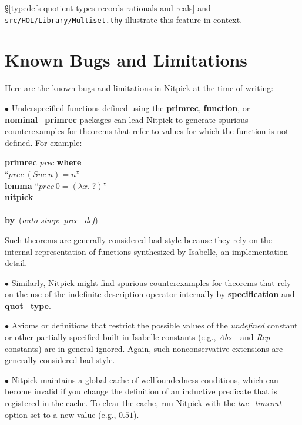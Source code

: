 \documentclass[a4paper,12pt]{article}
\def\unk{{?}}
\def\undef{(\lambda x.\; \unk)}
\begin{document}
\S\ref{typedefs-quotient-types-records-rationals-and-reals} and
\texttt{src/HOL/Library/Multiset.thy} illustrate this feature in context.

\section{Known Bugs and Limitations}
\label{known-bugs-and-limitations}

Here are the known bugs and limitations in Nitpick at the time of writing:

\begin{enum}
\item[$\bullet$] Underspecified functions defined using the \textbf{primrec},
\textbf{function}, or \textbf{nominal\_\allowbreak primrec} packages can lead
Nitpick to generate spurious counterexamples for theorems that refer to values
for which the function is not defined. For example:

\prew
\textbf{primrec} \textit{prec} \textbf{where} \\
``$\textit{prec}~(\textit{Suc}~n) = n$'' \\[2\smallskipamount]
\textbf{lemma} ``$\textit{prec}~0 = \undef$'' \\
\textbf{nitpick} \\[2\smallskipamount]
 \nopagebreak\\[2\smallskipamount]
\textbf{by}~(\textit{auto simp}:~\textit{prec\_def})
\postw

Such theorems are generally considered bad style because they rely on the
internal representation of functions synthesized by Isabelle, an implementation
detail.

\item[$\bullet$] Similarly, Nitpick might find spurious counterexamples for
theorems that rely on the use of the indefinite description operator internally
by \textbf{specification} and \textbf{quot\_type}.

\item[$\bullet$] Axioms or definitions that restrict the possible values of the
\textit{undefined} constant or other partially specified built-in Isabelle
constants (e.g., \textit{Abs\_} and \textit{Rep\_} constants) are in general
ignored. Again, such nonconservative extensions are generally considered bad
style.

\item[$\bullet$] Nitpick maintains a global cache of wellfoundedness conditions,
which can become invalid if you change the definition of an inductive predicate
that is registered in the cache. To clear the cache,
run Nitpick with the \textit{tac\_timeout} option set to a new value (e.g.,
$0.51$).


\end{enum}
\end{document}
